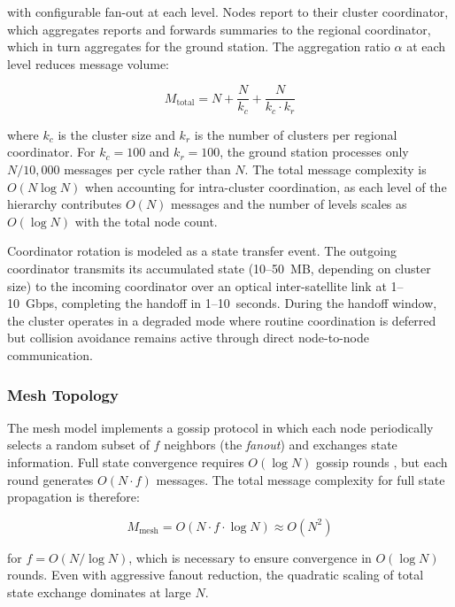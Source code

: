 \documentclass[journal]{IEEEtran}
\begin{document}
\noindent with configurable fan-out at each level. Nodes report to their cluster coordinator, which aggregates reports and forwards summaries to the regional coordinator, which in turn aggregates for the ground station. The aggregation ratio $\alpha$ at each level reduces message volume:

\begin{equation}
    M_{\text{total}} = N + \frac{N}{k_c} + \frac{N}{k_c \cdot k_r}
    \label{eq:hierarchical_messages}
\end{equation}

\noindent where $k_c$ is the cluster size and $k_r$ is the number of clusters per regional coordinator. For $k_c = 100$ and $k_r = 100$, the ground station processes only $N/10{,}000$ messages per cycle rather than $N$. The total message complexity is $O(N \log N)$ when accounting for intra-cluster coordination, as each level of the hierarchy contributes $O(N)$ messages and the number of levels scales as $O(\log N)$ with the total node count.

Coordinator rotation is modeled as a state transfer event. The outgoing coordinator transmits its accumulated state (10--50~MB, depending on cluster size) to the incoming coordinator over an optical inter-satellite link at 1--10~Gbps, completing the handoff in 1--10~seconds. During the handoff window, the cluster operates in a degraded mode where routine coordination is deferred but collision avoidance remains active through direct node-to-node communication.

\subsubsection{Mesh Topology}

The mesh model implements a gossip protocol in which each node periodically selects a random subset of $f$ neighbors (the \emph{fanout}) and exchanges state information. Full state convergence requires $O(\log N)$ gossip rounds \cite{demers_gossip}, but each round generates $O(N \cdot f)$ messages. The total message complexity for full state propagation is therefore:

\begin{equation}
    M_{\text{mesh}} = O(N \cdot f \cdot \log N) \approx O(N^2)
    \label{eq:mesh_messages}
\end{equation}

\noindent for $f = O(N / \log N)$, which is necessary to ensure convergence in $O(\log N)$ rounds. Even with aggressive fanout reduction, the quadratic scaling of total state exchange dominates at large $N$.
\end{document}
